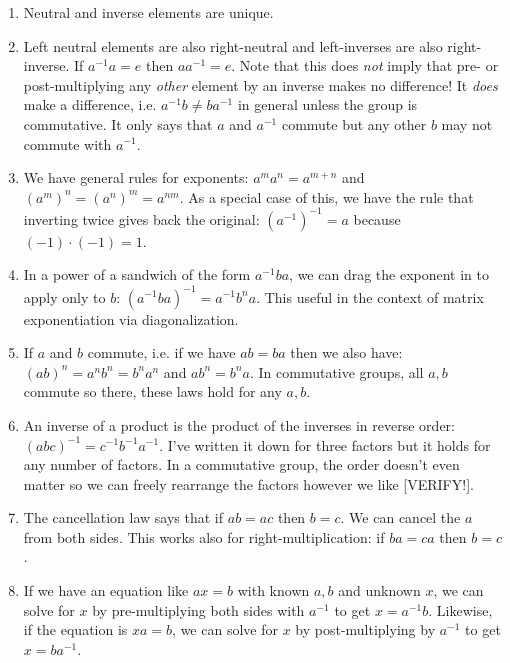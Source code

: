 \begin{enumerate}
\item Neutral and inverse elements are unique. 

\item Left neutral elements are also right-neutral and left-inverses are also right-inverse. If $a^{-1} a = e$ then $a a^{-1} = e$. Note that this does \emph{not} imply that pre- or post-multiplying any \emph{other} element by an inverse makes no difference! It \emph{does} make a difference, i.e. $a^{-1} b \neq b a^{-1}$ in general unless the group is commutative. It only says that $a$ and $a^{-1}$ commute but any other $b$ may not commute with $a^{-1}$.

\item We have general rules for exponents: $a^m a^n = a^{m+n}$ and $(a^{m})^{n} = (a^{n})^{m} = a^{n m}$. As a special case of this, we have the rule that inverting twice gives back the original: $(a^{-1})^{-1} = a$ because $(-1) \cdot (-1) = 1$.

\item In a power of a sandwich of the form $a^{-1} b a$, we can drag the exponent in to apply only to $b$: $(a^{-1} b a)^{-1} = a^{-1} b^n a$. This useful in the context of matrix exponentiation via diagonalization.

\item If $a$ and $b$ commute, i.e. if we have $a b = ba$ then we also have: $(a b)^n = a^n b^n = b^n a^n$ and $a b^n = b^n a$. In commutative groups, all $a,b$ commute so there, these laws hold for any $a,b$.

\item An inverse of a product is the product of the inverses in reverse order: $(a b c)^{-1} = c^{-1} b^{-1} a^{-1}$. I've written it down for three factors but it holds for any number of factors. In a commutative group, the order doesn't even matter so we can freely rearrange the factors however we like [VERIFY!]. 

\item The cancellation law says that if $a b = a c$ then $b = c$. We can cancel the $a$ from both sides. This works also for right-multiplication: if $b a = c a$ then $b = c$. 

\item If we have an equation like $a x = b$ with known $a, b$ and unknown $x$, we can solve for $x$ by pre-multiplying both sides with $a^{-1}$ to get $x = a^{-1}b$. Likewise, if the equation is $x a = b$, we can solve for $x$ by post-multiplying by $a^{-1}$ to get $x = b a^{-1}$. 
\end{enumerate}

